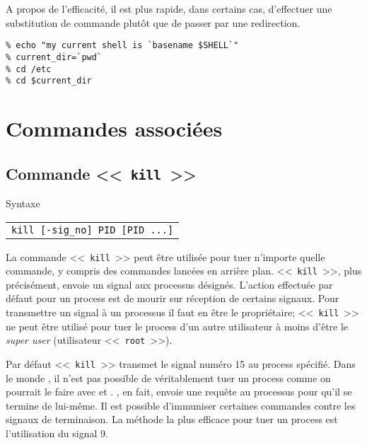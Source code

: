 A propos de l'efficacit{\'e}, il est plus rapide, dans certains cas, d'effectuer une substitution de commande plut{\^o}t que de passer par une redirection.

\begin{example}
\begin{verbatim}
% echo "my current shell is `basename $SHELL`"
% current_dir=`pwd`
% cd /etc
% cd $current_dir
\end{verbatim}
\end{example}

\section{Commandes associ{\'e}es}

\subsection{\label{multi-task-kill}Commande <<~{\tt kill}~>>}

\begin{definition}{Syntaxe}
\begin{tabular}{@{\hspace{1cm}}l}
	{\tt kill [-sig\_no] PID [PID ...]}\\[0.2cm]
\end{tabular}
\end{definition}

La commande <<~\texttt{kill}~>> peut {\^e}tre utilis{\'e}e pour tuer n'importe quelle commande, y compris des commandes lanc{\'e}es en arri{\`e}re plan. <<~{\tt kill}~>>, plus pr{\'e}cis{\'e}ment, envoie un signal aux processus d{\'e}sign{\'e}s. L'action effectu{\'e}e par d{\'e}faut pour un process est de mourir sur r{\'e}ception de certains signaux. Pour transmettre un signal {\`a} un processus il faut en {\^e}tre le propri{\'e}taire; <<~{\tt kill}~>> ne peut {\^e}tre utilis{\'e} pour tuer le process d'un autre utilisateur {\`a} moins d'{\^e}tre le {\sl super user} (utilisateur <<~{\tt root}~>>).

Par d{\'e}faut <<~{\tt kill}~>> transmet le signal num{\'e}ro 15 au process sp{\'e}cifi{\'e}.
Dans le monde {\Unix}, il n'est pas possible de v{\'e}ritablement tuer un process comme on pourrait le faire avec {\WindowsNT} et {\OpenVMS}. {\Unix}, en fait, envoie une requ{\^e}te au processus pour qu'il se termine de lui-m{\^e}me. Il est possible d'immuniser certaines commandes contre les signaux de terminaison. La
m{\'e}thode la plus efficace pour tuer un process est l'utilisation du signal 9.

